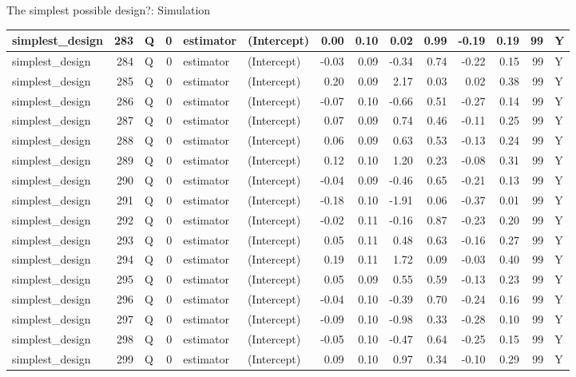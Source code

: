 \documentclass[
  11pt,
  ignorenonframetext,
]{beamer}
\begin{document}
\begin{frame}[fragile]{The simplest possible design?: Simulation}
\begin{tabular}{l|r|l|r|l|l|r|r|r|r|r|r|r|l}
\hline
simplest\_design & 283 & Q & 0 & estimator & (Intercept) & 0.00 & 0.10 & 0.02 & 0.99 & -0.19 & 0.19 & 99 & Y\\
\hline
simplest\_design & 284 & Q & 0 & estimator & (Intercept) & -0.03 & 0.09 & -0.34 & 0.74 & -0.22 & 0.15 & 99 & Y\\
\hline
simplest\_design & 285 & Q & 0 & estimator & (Intercept) & 0.20 & 0.09 & 2.17 & 0.03 & 0.02 & 0.38 & 99 & Y\\
\hline
simplest\_design & 286 & Q & 0 & estimator & (Intercept) & -0.07 & 0.10 & -0.66 & 0.51 & -0.27 & 0.14 & 99 & Y\\
\hline
simplest\_design & 287 & Q & 0 & estimator & (Intercept) & 0.07 & 0.09 & 0.74 & 0.46 & -0.11 & 0.25 & 99 & Y\\
\hline
simplest\_design & 288 & Q & 0 & estimator & (Intercept) & 0.06 & 0.09 & 0.63 & 0.53 & -0.13 & 0.24 & 99 & Y\\
\hline
simplest\_design & 289 & Q & 0 & estimator & (Intercept) & 0.12 & 0.10 & 1.20 & 0.23 & -0.08 & 0.31 & 99 & Y\\
\hline
simplest\_design & 290 & Q & 0 & estimator & (Intercept) & -0.04 & 0.09 & -0.46 & 0.65 & -0.21 & 0.13 & 99 & Y\\
\hline
simplest\_design & 291 & Q & 0 & estimator & (Intercept) & -0.18 & 0.10 & -1.91 & 0.06 & -0.37 & 0.01 & 99 & Y\\
\hline
simplest\_design & 292 & Q & 0 & estimator & (Intercept) & -0.02 & 0.11 & -0.16 & 0.87 & -0.23 & 0.20 & 99 & Y\\
\hline
simplest\_design & 293 & Q & 0 & estimator & (Intercept) & 0.05 & 0.11 & 0.48 & 0.63 & -0.16 & 0.27 & 99 & Y\\
\hline
simplest\_design & 294 & Q & 0 & estimator & (Intercept) & 0.19 & 0.11 & 1.72 & 0.09 & -0.03 & 0.40 & 99 & Y\\
\hline
simplest\_design & 295 & Q & 0 & estimator & (Intercept) & 0.05 & 0.09 & 0.55 & 0.59 & -0.13 & 0.23 & 99 & Y\\
\hline
simplest\_design & 296 & Q & 0 & estimator & (Intercept) & -0.04 & 0.10 & -0.39 & 0.70 & -0.24 & 0.16 & 99 & Y\\
\hline
simplest\_design & 297 & Q & 0 & estimator & (Intercept) & -0.09 & 0.10 & -0.98 & 0.33 & -0.28 & 0.10 & 99 & Y\\
\hline
simplest\_design & 298 & Q & 0 & estimator & (Intercept) & -0.05 & 0.10 & -0.47 & 0.64 & -0.25 & 0.15 & 99 & Y\\
\hline
simplest\_design & 299 & Q & 0 & estimator & (Intercept) & 0.09 & 0.10 & 0.97 & 0.34 & -0.10 & 0.29 & 99 & Y\\

\end{tabular}
\end{frame}
\end{document}
